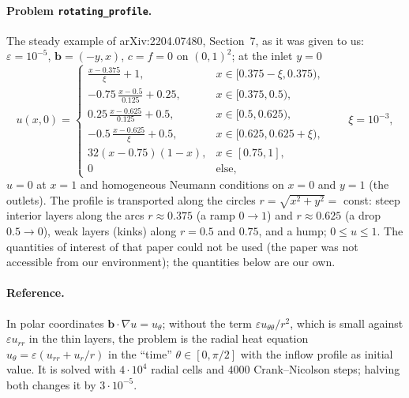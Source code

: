 \documentclass[11pt]{article}
\newcommand{\eps}{\varepsilon}
\newcommand{\bb}{\boldsymbol{b}}
\begin{document}
\paragraph{Problem \texttt{rotating\_profile}.} The steady example of arXiv:2204.07480, Section~7, as it was given to
us: $\eps=10^{-5}$, $\bb=(-y,x)$, $c=f=0$ on $(0,1)^2$; at the inlet $y=0$
\[
  u(x,0)=\begin{cases}\frac{x-0.375}{\xi}+1, & x\in[0.375-\xi,0.375),\\
  -0.75\,\frac{x-0.5}{0.125}+0.25, & x\in[0.375,0.5),\\
  0.25\,\frac{x-0.625}{0.125}+0.5, & x\in[0.5,0.625),\\
  -0.5\,\frac{x-0.625}{\xi}+0.5, & x\in[0.625,0.625+\xi),\\
  32(x-0.75)(1-x), & x\in[0.75,1],\\ 0 & \text{else},\end{cases}\qquad\xi=10^{-3},
\]
$u=0$ at $x=1$ and homogeneous Neumann conditions on $x=0$ and $y=1$ (the outlets). The profile is transported along
the circles $r=\sqrt{x^2+y^2}=$ const: steep interior layers along the arcs $r\approx0.375$ (a ramp $0\to1$) and
$r\approx0.625$ (a drop $0.5\to0$), weak layers (kinks) along $r=0.5$ and $0.75$, and a hump; $0\le u\le1$. The
quantities of interest of that paper could not be used (the paper was not accessible from our environment); the
quantities below are our own.

\paragraph{Reference.} In polar coordinates $\bb\cdot\nabla u=u_\theta$; without the term $\eps u_{\theta\theta}/r^2$,
which is small against $\eps u_{rr}$ in the thin layers, the problem is the radial heat equation
$u_\theta=\eps(u_{rr}+u_r/r)$ in the ``time'' $\theta\in[0,\pi/2]$ with the inflow profile as initial value. It is
solved with $4\cdot10^4$ radial cells and $4000$ Crank--Nicolson steps; halving both changes it by $3\cdot10^{-5}$.
\end{document}
